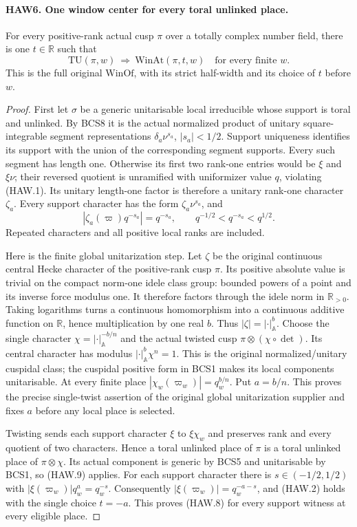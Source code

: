 \documentclass[11pt,a4paper]{article}
\numberwithin{equation}{section}
\theoremstyle{remark}\newtheorem{remark}[theorem]{Remark}
\begin{document}
\paragraph{HAW6. One window center for every toral unlinked place.}
\label{claim:HAW6}
For every positive-rank actual cusp $\pi$ over a totally
complex number field, there is one $t\in\mathbb R$ such that
\[
       \mathrm{TU}(\pi,w)\ \Longrightarrow\
                  \mathrm{WinAt}(\pi,t,w)
                        \quad\text{for every finite }w.
 \tag{HAW.8}
\]
This is the full original $\mathrm{WinOf}$, with its strict
half-width and its choice of $t$ before $w$.
\begin{proof}
First let $\sigma$ be a generic unitarisable local irreducible
whose support is toral and unlinked.  By BCS8 it is the actual
normalized product of unitary square-integrable segment
representations $\delta_a\nu^{s_a}$, $|s_a|<1/2$.
Support uniqueness identifies its support with the union of
the corresponding segment supports.  Every such segment has
length one.  Otherwise its first two rank-one entries would
be $\xi$ and $\xi\nu$; their reversed quotient is unramified
with uniformizer value $q$, violating (HAW.1).  Its unitary
length-one factor is therefore a unitary rank-one character
$\zeta_a$.  Every support character has the form
$\zeta_a\nu^{s_a}$, and
\[
             |\zeta_a(\varpi)q^{-s_a}|=q^{-s_a},
                     \qquad q^{-1/2}<q^{-s_a}<q^{1/2}.
 \tag{HAW.9}
\]
Repeated characters and all positive local ranks are included.

Here is the finite global unitarization step.  Let $\zeta$
be the original continuous central Hecke character of the
positive-rank cusp $\pi$.  Its positive absolute value is
trivial on the compact norm-one idele class group: bounded
powers of a point and its inverse force modulus one.
It therefore factors through the idele norm in
$\mathbb R_{>0}$.  Taking logarithms turns a continuous
homomorphism into a continuous additive function on
$\mathbb R$, hence multiplication by one real $b$.
Thus $|\zeta|=|\cdot|_{\mathbb A}^{b}$.
Choose the single character
$\chi=|\cdot|_{\mathbb A}^{-b/n}$ and the actual twisted
cusp $\pi\otimes(\chi\circ\det)$.  Its central character
has modulus $|\cdot|_{\mathbb A}^{b}\chi^n=1$.
This is the original normalized/unitary cuspidal class;
the cuspidal positive form in BCS1 makes its local
components unitarisable.  At every finite place
$|\chi_w(\varpi_w)|=q_w^{b/n}$.  Put $a=b/n$.
This proves the precise single-twist assertion of the
original global unitarization supplier and fixes $a$
before any local place is selected.

Twisting sends each support character $\xi$ to
$\xi\chi_w$ and preserves rank and every quotient of two
characters.  Hence a toral unlinked place of $\pi$ is a
toral unlinked place of $\pi\otimes\chi$.  Its actual
component is generic by BCS5 and unitarisable by BCS1, so
(HAW.9) applies.  For each support character there is
$s\in(-1/2,1/2)$ with
$|\xi(\varpi_w)|q_w^a=q_w^{-s}$.
Consequently $|\xi(\varpi_w)|=q_w^{-a-s}$, and (HAW.2)
holds with the single choice $t=-a$.  This proves (HAW.8)
for every support witness at every eligible place.
\end{proof}
\end{document}
